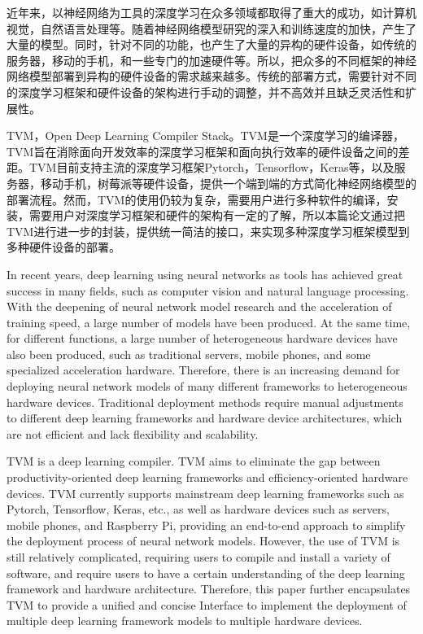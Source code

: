 
\begin{cabstract}
近年来，以神经网络为工具的深度学习在众多领域都取得了重大的成功，如计算机视觉，自然语言处理等。随着神经网络模型研究的深入和训练速度的加快，产生了大量的模型。同时，针对不同的功能，也产生了大量的异构的硬件设备，如传统的服务器，移动的手机，和一些专门的加速硬件等。所以，把众多的不同框架的神经网络模型部署到异构的硬件设备的需求越来越多。传统的部署方式，需要针对不同的深度学习框架和硬件设备的架构进行手动的调整，并不高效并且缺乏灵活性和扩展性。

TVM，Open Deep Learning Compiler Stack。TVM是一个深度学习的编译器，TVM旨在消除面向开发效率的深度学习框架和面向执行效率的硬件设备之间的差距。TVM目前支持主流的深度学习框架Pytorch，Tensorflow，Keras等，以及服务器，移动手机，树莓派等硬件设备，提供一个端到端的方式简化神经网络模型的部署流程。然而，TVM的使用仍较为复杂，需要用户进行多种软件的编译，安装，需要用户对深度学习框架和硬件的架构有一定的了解，所以本篇论文通过把TVM进行进一步的封装，提供统一简洁的接口，来实现多种深度学习框架模型到多种硬件设备的部署。
\end{cabstract}

\begin{eabstract}
In recent years, deep learning using neural networks as tools has achieved great success in many fields, such as computer vision and natural language processing. With the deepening of neural network model research and the acceleration of training speed, a large number of models have been produced. At the same time, for different functions, a large number of heterogeneous hardware devices have also been produced, such as traditional servers, mobile phones, and some specialized acceleration hardware. Therefore, there is an increasing demand for deploying neural network models of many different frameworks to heterogeneous hardware devices. Traditional deployment methods require manual adjustments to different deep learning frameworks and hardware device architectures, which are not efficient and lack flexibility and scalability.

TVM is a deep learning compiler. TVM aims to eliminate the gap between productivity-oriented deep learning frameworks and efficiency-oriented hardware devices. TVM currently supports mainstream deep learning frameworks such as Pytorch, Tensorflow, Keras, etc., as well as hardware devices such as servers, mobile phones, and Raspberry Pi, providing an end-to-end approach to simplify the deployment process of neural network models. However, the use of TVM is still relatively complicated, requiring users to compile and install a variety of software, and require users to have a certain understanding of the deep learning framework and hardware architecture. Therefore, this paper further encapsulates TVM to provide a unified and concise Interface to implement the deployment of multiple deep learning framework models to multiple hardware devices.
\end{eabstract}